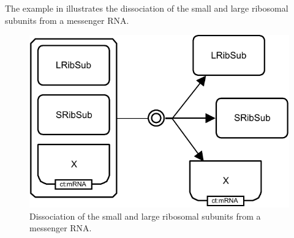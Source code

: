 The example in  illustrates the dissociation of the small and large ribosomal subunits from a messenger RNA.

\begin{figure}[H]
  \centering
  \includegraphics[scale = 0.8]{examples/dissociation-ribosome}
  \caption{Dissociation of the small and large ribosomal subunits from a messenger RNA.}
  \label{fig:dissoc-ribo}
\end{figure}
